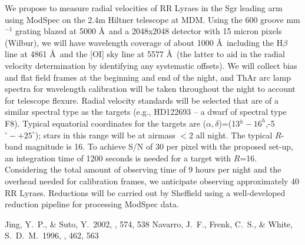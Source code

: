 \documentclass[preprint]{aastex}
\begin{document}
We propose to measure radial velocities of RR Lyraes in the Sgr leading arm using ModSpec on the 2.4m Hiltner
telescope at MDM.  Using the 600 groove mm$^{-1}$ grating blazed at 5000 \AA\ and a 2048x2048 detector with 15 micron pixels (Wilbur), we will have wavelength coverage of about 1000 \AA\, including the H$\beta$ line at 4861 \AA\ and the [OI] sky line at 5577 \AA\ (the latter to aid in the radial velocity determination by identifying any systematic offsets).  We will collect bias and flat field frames at the beginning and end of the night, and ThAr arc lamp spectra for wavelength calibration will be taken throughout the night to account for telescope flexure.  Radial velocity standards will be selected that are of a similar spectral type as the targets (e.g., HD122693  -- a dwarf of spectral type F8). 
Typical equatorial coordinates for the targets are ($\alpha,\delta$)=(13$^{h}-16^{h}$,-5$^{\circ}- +25^{\circ}$); stars in this range will be at airmass $<2$ all night.
The typical $R$-band magnitude is 16.  To achieve S/N of 30 per pixel with the proposed set-up, an integration time of 1200 seconds is needed for a target with $R$=16.  Considering the total amount of observing time of 9 hours per night and the overhead needed for calibration frames, we anticipate observing approximately 40 RR Lyraes.  Reductions will be carried out by Sheffield using a well-developed reduction pipeline for processing ModSpec data. 

\begin{thebibliography}[99]
 Jing, Y.~P., \& Suto, Y.\ 2002, \apj, 574, 538 
 Navarro, J.~F., Frenk, 
C.~S., \& White, S.~D.~M.\ 1996, \apj, 462, 563 
\end{thebibliography}
\end{document}
